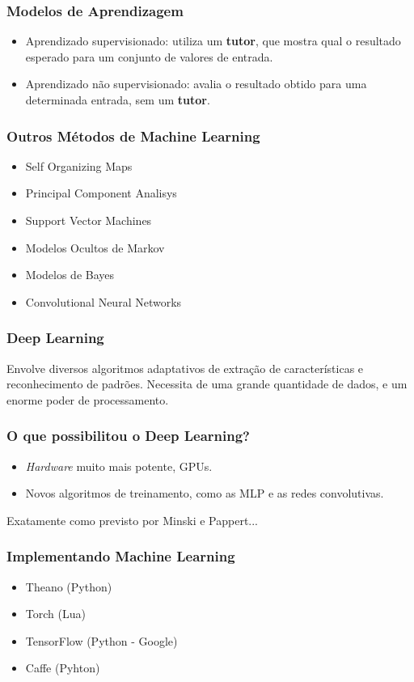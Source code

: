 \documentclass[aspectratio=169,12pt]{beamer}
\begin{document}
\begin{frame}
    \frametitle{Modelos de Aprendizagem}
    \begin{itemize}
        \setlength\itemsep{1em}
        \item Aprendizado supervisionado: utiliza um \textbf{tutor},
        que mostra qual o resultado esperado para um conjunto de
        valores de entrada.
        \item Aprendizado não supervisionado: avalia o resultado obtido
        para uma determinada entrada, sem um \textbf{tutor}.
    \end{itemize}
\end{frame}
    
\begin{frame}
    \frametitle{Outros Métodos de Machine Learning}
    \begin{itemize}
        \setlength\itemsep{1em}
        \item Self Organizing Maps
        \item Principal Component Analisys
        \item Support Vector Machines
        \item Modelos Ocultos de Markov
        \item Modelos de Bayes
        \item Convolutional Neural Networks
    \end{itemize}
\end{frame}
   
\begin{frame}
    \frametitle{Deep Learning}
    \vfill
    Envolve diversos algoritmos adaptativos de extração de características
    e reconhecimento de padrões.
    \vfill
    Necessita de uma grande quantidade de dados, e um enorme poder de
    processamento.
    \vfill
\end{frame}

\begin{frame}
    \frametitle{O que possibilitou o Deep Learning?}
    \vfill
    \begin{itemize}
        \setlength\itemsep{1em}
        \item{\emph{Hardware} muito mais potente, GPUs.}
        \item{Novos algoritmos de treinamento, como as MLP e as redes convolutivas.}
    \end{itemize}
    \vfill
    Exatamente como previsto por Minski e Pappert...
\end{frame}
    
\begin{frame}
    \frametitle{Implementando Machine Learning}
    \begin{itemize}
        \setlength\itemsep{1em}
        \item Theano (Python)
        \item Torch (Lua)
        \item TensorFlow (Python - Google)
        \item Caffe (Pyhton)
    \end{itemize}
\end{frame}
    
\end{document}

